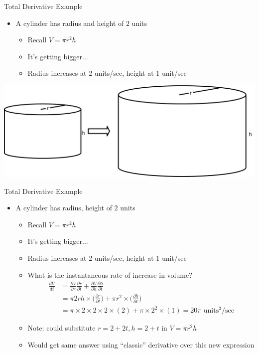 \documentclass[aspectratio=169]{beamer}
\begin{document}
\begin{frame}{Total Derivative Example}

\begin{itemize}
	\item A cylinder has radius and height of $2$ units 
	\begin{itemize}
		\item Recall $V = \pi r^2 h$
		\item It's getting bigger...
		\item Radius increases at 2 units/sec, height at 1 unit/sec
	\end{itemize}
\end{itemize}
\begin{center}
\includegraphics[width=.75\textwidth]{lectBP/cyl.pdf}
\end{center}
\end{frame}
\begin{frame}{Total Derivative Example}

\begin{itemize}
	\item A cylinder has radius, height of $2$ units 
	\begin{itemize}
		\item Recall $V = \pi r^2 h$
		\item It's getting bigger...
		\item Radius increases at 2 units/sec, height at 1 unit/sec
	\item What is the instantaneous rate of increase in volume?
		\begin{align}
		\frac{dV}{dt} &= \frac{\partial V}{\partial r} \frac{\partial r}{\partial t} +
                         \frac{\partial V}{\partial h} \frac{\partial h}{\partial t} \nonumber \\
			&= \pi 2r h \times  \Big( \frac{\partial r}{\partial t} \Big) + 
				\pi r^2 \times  \Big( \frac{\partial h}{\partial t} \Big) \nonumber \\
			&= \pi \times 2 \times 2  \times 2 \times (2) + \pi \times 2^2 \times (1) = 20\pi \textrm{ units}^3/\textrm{sec}\nonumber \end{align}
		\item Note: could substitute $r = 2 + 2t, h = 2 + t$ in $V = \pi r^2 h$
		\item Would get same answer
			using ``classic'' derivative over this new expression
	\end{itemize}
\end{itemize}
\end{frame}
\end{document}
